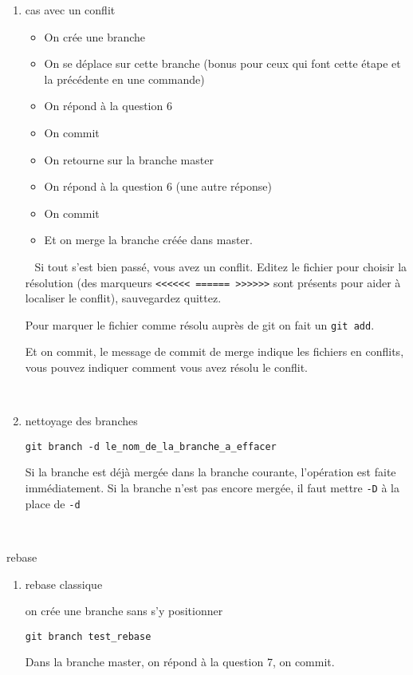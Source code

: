 \documentclass[10pt]{exam}
\begin{document}
\begin{questions}
\begin{enumerate}
~

\item cas avec un conflit

\begin{itemize}
\item On crée une branche
\item On se déplace sur cette branche (bonus pour ceux qui font cette étape et la précédente en une commande)
\item On répond à la question 6
\item On commit
\item On retourne sur la branche master
\item On répond à la question 6 (une autre réponse)
\item On commit 
\item Et on merge la branche créée dans master.
\end{itemize}

~
Si tout s'est bien passé, vous avez un conflit. Editez le fichier pour choisir la résolution (des marqueurs \texttt{<{}<{}<{}<{}<{}< ====== >{}>{}>{}>{}>{}>} sont présents pour aider à localiser le conflit), sauvegardez quittez.

Pour marquer le fichier comme résolu auprès de git on fait un \texttt{git add}.

Et on commit, le message de commit de merge indique les fichiers en conflits, vous pouvez indiquer comment vous avez résolu le conflit.

~

\item nettoyage des branches
\begin{lstlisting}
git branch -d le_nom_de_la_branche_a_effacer
\end{lstlisting}
Si la branche est déjà mergée dans la branche courante, l'opération est faite immédiatement. Si la branche n'est pas encore mergée, il faut mettre \texttt{-D} à la place de \texttt{-d}
\end{enumerate}

~

\question rebase

\begin{enumerate}
\item rebase classique

on crée une branche sans s'y positionner
\begin{lstlisting}
git branch test_rebase
\end{lstlisting}
Dans la branche master, on répond à la question 7, on commit.


\end{enumerate}
\end{questions}
\end{document}

